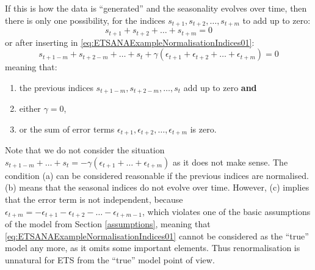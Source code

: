 \documentclass[
]{book}
\providecommand{\tightlist}{%
  \setlength{\itemsep}{0pt}\setlength{\parskip}{0pt}}
\theoremstyle{definition}
\theoremstyle{definition}
\theoremstyle{definition}
\theoremstyle{definition}
\theoremstyle{remark}
\begin{document}
If this is how the data is ``generated'' and the seasonality evolves over time, then there is only one possibility, for the indices \(s_{t+1}, s_{t+2}, \dots, s_{t+m}\) to add up to zero:
\begin{equation}
  s_{t+1}+ s_{t+2}+ \dots+ s_{t+m} = 0
  \label{eq:ETSANAExampleNormalisationIndices02a}
\end{equation}
or after inserting in \eqref{eq:ETSANAExampleNormalisationIndices01}:
\begin{equation}
  s_{t+1-m}+ s_{t+2-m}+ \dots+ s_{t} + \gamma \left(\epsilon_{t+1}+ \epsilon_{t+2}+ \dots+ \epsilon_{t+m}\right) = 0
  \label{eq:ETSANAExampleNormalisationIndices02b}
\end{equation}
meaning that:

\begin{enumerate}
\def\labelenumi{\alph{enumi}.}
\tightlist
\item
  the previous indices \(s_{t+1-m}, s_{t+2-m}, \dots, s_{t}\) add up to zero \textbf{and}
\item
  either \(\gamma=0\),
\item
  or the sum of error terms \(\epsilon_{t+1}, \epsilon_{t+2}, \dots, \epsilon_{t+m}\) is zero.
\end{enumerate}

Note that we do not consider the situation \(s_{t+1-m}+ \dots+ s_{t} = -\gamma \left(\epsilon_{t+1}+ \dots+ \epsilon_{t+m}\right)\) as it does not make sense. The condition (a) can be considered reasonable if the previous indices are normalised. (b) means that the seasonal indices do not evolve over time. However, (c) implies that the error term is not independent, because \(\epsilon_{t+m} = -\epsilon_{t+1}- \epsilon_{t+2}- \dots- \epsilon_{t+m-1}\), which violates one of the basic assumptions of the model from Section \ref{assumptions}, meaning that \eqref{eq:ETSANAExampleNormalisationIndices01} cannot be considered as the ``true'' model any more, as it omits some important elements. Thus renormalisation is unnatural for ETS from the ``true'' model point of view.
\end{document}
